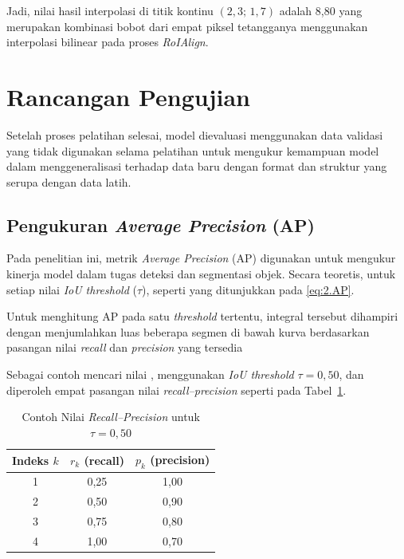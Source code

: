 \bigskip
Jadi, nilai hasil interpolasi di titik kontinu $(2{,}3;\,1{,}7)$ adalah 8{,}80  
yang merupakan kombinasi bobot dari empat piksel tetangganya menggunakan interpolasi bilinear pada proses \textit{RoIAlign}.

\section{Rancangan Pengujian} \label{III.Rancang_Uji}
Setelah proses pelatihan selesai, model dievaluasi menggunakan data validasi yang tidak digunakan selama pelatihan untuk mengukur kemampuan model dalam menggeneralisasi terhadap data baru dengan format dan struktur yang serupa dengan data latih.

\subsection{Pengukuran \textit{Average Precision} (AP)}
Pada penelitian ini, metrik \textit{Average Precision} (AP) digunakan untuk mengukur kinerja model dalam tugas deteksi dan segmentasi objek. Secara teoretis, untuk setiap nilai \textit{IoU threshold} ($\tau$), seperti yang ditunjukkan pada \ref{eq:2.AP}. 


Untuk menghitung AP pada satu \textit{threshold} tertentu, integral tersebut dihampiri dengan menjumlahkan luas beberapa segmen di bawah kurva berdasarkan pasangan nilai \textit{recall} dan \textit{precision} yang tersedia


Sebagai contoh mencari nilai \APfifty, menggunakan \textit{IoU threshold} $\tau = 0{,}50$, dan diperoleh empat pasangan nilai \textit{recall--precision} seperti pada Tabel~\ref{table:3.contoh-pr-05}. 

\medskip
\begin{table}[H]
\centering
\caption{Contoh Nilai \textit{Recall--Precision} untuk $\tau = 0{,}50$}
\renewcommand{\arraystretch}{1.3}
\label{table:3.contoh-pr-05}
\begin{tabular}{|c|c|c|}
\hline
\textbf{Indeks} $k$ & \textbf{$r_k$ (recall)} & \textbf{$p_k$ (precision)} \\
\hline
1 & 0,25 & 1,00 \\
\hline
2 & 0,50 & 0,90 \\
\hline
3 & 0,75 & 0,80 \\
\hline
4 & 1,00 & 0,70 \\
\hline
\end{tabular}
\end{table}

